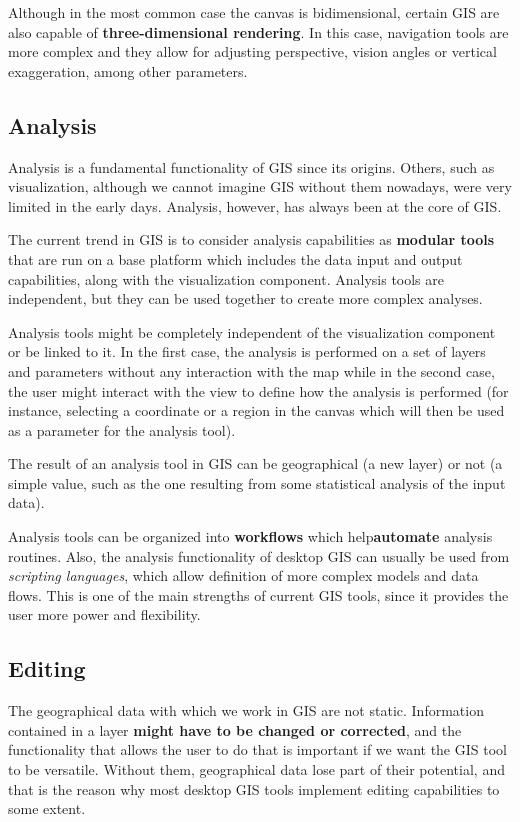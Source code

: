 Although in the most common case the canvas is bidimensional, certain GIS are also capable of \textbf{three-di\-men\-sio\-nal rendering}. In this case, navigation tools are more complex and they allow for adjusting perspective, vision angles or vertical exaggeration, among other parameters.

\subsection{Analysis}

Analysis is a fundamental functionality of GIS since its origins. Others, such as visualization, although we cannot imagine GIS without them nowadays, were very limited in the early days. Analysis, however, has always been at the core of GIS.

The current trend in GIS is to consider analysis capabilities as \textbf{modular tools} that are run on a base platform which includes the data input and output capabilities, along with the visualization component. Analysis tools are independent, but they can be used together to create more complex analyses.

Analysis tools might be completely independent of the visualization component or be linked to it. In the first case, the analysis is performed on a set of layers and parameters without any interaction with the map while in the second case, the user might interact with the view to define how the analysis is performed (for instance, selecting a coordinate or a region in the canvas which will then be used as a parameter for the analysis tool).

The result of an analysis tool in GIS can be geographical (a new layer) or not (a simple value, such as the one resulting from some statistical analysis of the input data).

Analysis tools can be organized into \textbf{workflows} which help\textbf{automate} analysis routines. Also, the analysis functionality of desktop GIS can usually be used from \emph{scripting languages}, which allow definition of more complex models and data flows. This is one of the main strengths of current GIS tools, since it provides the user more power and flexibility.

\subsection{Editing}

The geographical data with which we work in GIS are not static. Information contained in a layer \textbf{might have to be changed or corrected}, and the functionality that allows the user to do that is important if we want the GIS tool to be versatile. Without them, geographical data lose part of their potential, and that is the reason why most desktop GIS tools implement editing capabilities to some extent.

